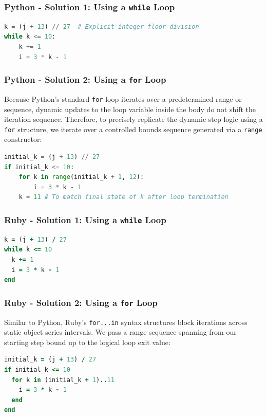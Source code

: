 \documentclass[11pt]{article}
\begin{document}
\subsubsection*{Python - Solution 1: Using a \texttt{while} Loop}
\begin{lstlisting}[language=Python]
k = (j + 13) // 27  # Explicit integer floor division
while k <= 10:
    k += 1
    i = 3 * k - 1
\end{lstlisting}

\subsubsection*{Python - Solution 2: Using a \texttt{for} Loop}
Because Python's standard \texttt{for} loop iterates over a predetermined range or sequence, dynamic updates to the loop variable inside the body do not shift the iteration sequence. Therefore, to precisely replicate the dynamic step logic using a \texttt{for} structure, we iterate over a controlled bounds sequence generated via a \texttt{range} constructor:
\begin{lstlisting}[language=Python]
initial_k = (j + 13) // 27
if initial_k <= 10:
    for k in range(initial_k + 1, 12):
        i = 3 * k - 1
    k = 11 # To match final state of k after loop termination
\end{lstlisting}

\subsubsection*{Ruby - Solution 1: Using a \texttt{while} Loop}
\begin{lstlisting}[language=Ruby]
k = (j + 13) / 27
while k <= 10
  k += 1
  i = 3 * k - 1
end
\end{lstlisting}

\subsubsection*{Ruby - Solution 2: Using a \texttt{for} Loop}
Similar to Python, Ruby's \texttt{for...in} syntax structures block iterations across static object series intervals. We pass a range sequence spanning from our starting step bound up to the logical loop exit value:
\begin{lstlisting}[language=Ruby]
initial_k = (j + 13) / 27
if initial_k <= 10
  for k in (initial_k + 1)..11
    i = 3 * k - 1
  end
end
\end{lstlisting}
\end{document}
